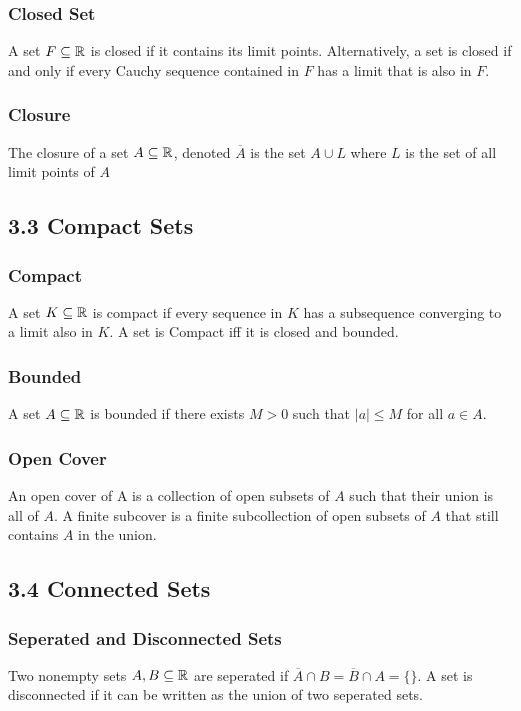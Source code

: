\documentclass{article}
\begin{document}
\subsubsection*{Closed Set}
A set $F \subseteq \protect\mathbb{R}$ is closed if it contains its limit points. Alternatively, a set is closed if and only if every Cauchy sequence contained in $F$ has a limit that is also in $F$.

\subsubsection*{Closure}
The closure of a set $A \subseteq \protect\mathbb{R}$, denoted $\overline{A}$ is the set $A \cup L$ where $L$ is the set of all limit points of $A$

\subsection*{3.3 Compact Sets}
\subsubsection*{Compact}
A set $K \subseteq \protect\mathbb{R}$ is compact if every sequence in $K$ has a subsequence converging to a limit also in $K$. A set is Compact iff it is closed and bounded.

\subsubsection*{Bounded}
A set $A \subseteq \protect\mathbb{R}$ is bounded if there exists $M > 0$ such that $|a| \le M$ for all $a \in A$.

\subsubsection*{Open Cover}
An open cover of A is a collection of open subsets of $A$ such that their union is all of $A$. A finite subcover is a finite subcollection of open subsets of $A$ that still contains $A$ in the union.

\subsection*{3.4 Connected Sets}
\subsubsection*{Seperated and Disconnected Sets}
Two nonempty sets $A, B \subseteq \protect\mathbb{R}$ are seperated if $\overline{A}\cap B = \overline{B} \cap A = \{\}$. A set is disconnected if it can be written as the union of two seperated sets.
\end{document}
